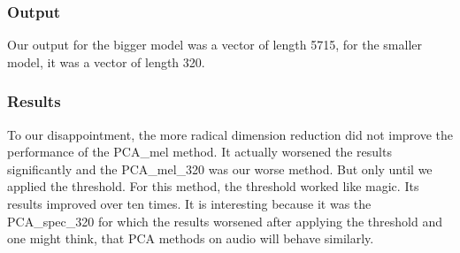 \subsubsection{Output}
Our output for the bigger model was a vector of length 5715, for the smaller model, it was a vector of length 320.

\subsubsection{Results}
To our disappointment, the more radical dimension reduction did not improve the performance of the PCA\_mel method. It actually worsened the results significantly and the PCA\_mel\_320 was our worse method. But only until we applied the threshold. For this method, the threshold worked like magic. Its results improved over ten times. It is interesting because it was the PCA\_spec\_320 for which the results worsened after applying the threshold and one might think, that PCA methods on audio will behave similarly.

